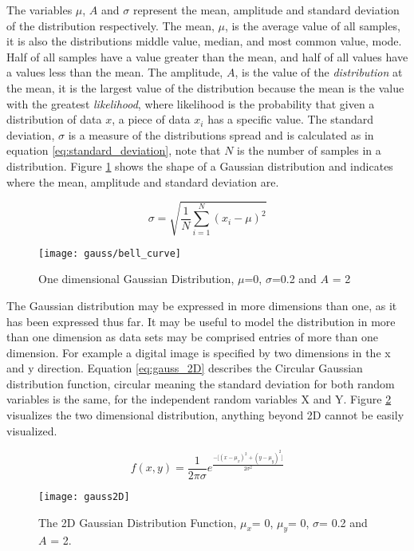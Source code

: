 The variables $\mu$, $A$ and $\sigma$ represent the mean, amplitude and standard deviation of the distribution respectively. The mean, $\mu$, is the average value of all samples, it is also the distributions middle value, median, and most common value, mode. Half of all samples have a value greater than the mean, and half of all values have a values less than the mean. The amplitude, $A$, is the value of the \emph{distribution} at the mean, it is the largest value of the distribution because the mean is the value with the greatest \emph{likelihood}, where likelihood is the probability that given a distribution of data $x$, a piece of data $x_i$ has a specific value. The standard deviation, $\sigma$ is a measure of the distributions spread and is calculated as in equation \ref{eq:standard_deviation}, note that $N$ is the number of samples in a distribution. Figure \ref{fig:gauss} shows the shape of a Gaussian distribution and indicates where the mean, amplitude and standard deviation are.

\begin{equation}
  \sigma = \sqrt{\frac{1}{N}\sum_{i=1}^{N}(x_i - \mu)^2}
  \label{eq:standard_deviation}
\end{equation}

\begin{figure}[H]
  \centering
  \centering\texttt{[image: gauss/bell\_curve]}
  \caption{One dimensional Gaussian Distribution, $\mu$=0, $\sigma$=0.2 and $A$ = 2}
  \label{fig:gauss}
\end{figure}

The Gaussian distribution may be expressed in more dimensions than one, as it has been expressed thus far. It may be useful to model the distribution in more than one dimension as data sets may be comprised entries of more than one dimension. For example a digital image is specified by two dimensions in the x and y direction. Equation \ref{eq:gauss_2D} describes the Circular Gaussian distribution function, circular meaning the standard deviation for both random variables is the same, for the independent random variables X and Y. Figure \ref{fig:gauss_2D} visualizes the two dimensional distribution, anything beyond 2D cannot be easily visualized. 

\begin{equation}
f(x,y) = \frac{1}{2\pi\sigma}e^\frac{{-\big[(x-\mu_x)^2 + (y-\mu_y)^2\big]}}{2\sigma^2}
\label{eq:gauss_2D}
\end{equation}

\begin{figure}[H]
  \centering
  \centering\texttt{[image: gauss2D]}
  \caption{The 2D Gaussian Distribution Function, $\mu_x$= 0, $\mu_y$= 0, $\sigma$= 0.2 and $A$ = 2.}
  \label{fig:gauss_2D}
\end{figure}







  
  
